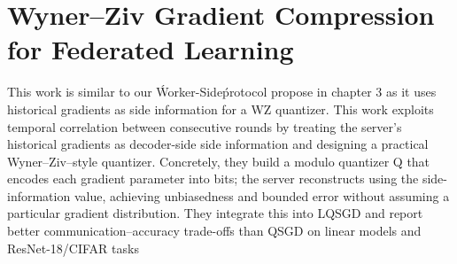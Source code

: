 \section{Wyner–Ziv Gradient Compression for Federated Learning \cite{liang2021wynerziv}}
This work is similar to our \'Worker-Side\' protocol propose in chapter 3 as it uses historical gradients as side information for a WZ quantizer.
This work exploits temporal correlation between consecutive rounds by treating the server’s historical gradients as decoder-side side information and designing a practical Wyner–Ziv–style quantizer. Concretely, they build a modulo quantizer Q that encodes each gradient parameter into \log\s bits; the server reconstructs using the side-information value, achieving unbiasedness and bounded error without assuming a particular gradient distribution. They integrate this into LQSGD and report better communication–accuracy trade-offs than QSGD on linear models and ResNet-18/CIFAR tasks
